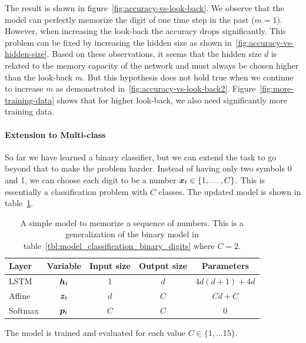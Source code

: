 		The result is shown in figure~\ref{fig:accuracy-vs-look-back}. 
		We observe that the model can perfectly memorize the digit of one time step in the past ($m = 1$).
		However, when increasing the look-back the accuracy drops significantly.
		This problem can be fixed by increasing the hidden size as shown in~\ref{fig:accuracy-vs-hidden-size}.
		Based on these observations, it seems that the hidden size $d$ is related to the memory capacity of the network and must always be chosen higher than the look-back $m$. 
		But this hypothesis does not hold true when we continue to increase $m$ as demonstrated in~\ref{fig:accuracy-vs-look-back2}.
		Figure~\ref{fig:more-training-data} shows that for higher look-back, we also need significantly more training data. 
		
		\paragraph{Extension to Multi-class}
		So far we have learned a binary classifier, but we can extend the task to go beyond that to make the problem harder.
		Instead of having only two symbols 0 and 1, we can choose each digit to be a number $\bm{x}_t \in \{1, \dots, C\}$.
		This is essentially a classification problem with $C$ classes.
		The updated model is shown in table~\ref{tbl:model_classification_multi_class_digits}.
		\begin{table}[tb]
			\small
			\begin{center}
				\begin{tabular}{|l|c|c|c|c|}
					\hline
					Layer 	& Variable 			& Input size 	& Output size 	& Parameters 			\\ \hline
					LSTM 	& $\bm{h}_t$		& 1 			& $d$ 			& $4d(d + 1) + 4d$ 		\\ \hline
					Affine 	& $\bm{z}_t$		& $d$ 			& $C$ 			& $Cd + C$ 				\\ \hline
					Softmax & $\bm{p}_t$		& $C$ 			& $C$ 			& 0						\\ \hline
				\end{tabular}
			\end{center}
			\caption[A simple model to memorize a sequence of numbers]
					{A simple model to memorize a sequence of numbers.
					 This is a generalization of the binary model in table~\ref{tbl:model_classification_binary_digits} where $C = 2$.}
			\label{tbl:model_classification_multi_class_digits}
		\end{table}
		The model is trained and evaluated for each value $C \in \{1, \dots 15\}$.
